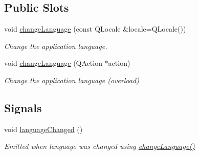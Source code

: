\subsection*{Public Slots}
\begin{DoxyCompactItemize}
\item 
void \hyperlink{classmdt_application_a60cf66d3ebe17d1e60a7dcc26410494d}{changeLanguage} (const QLocale \&locale=QLocale())
\begin{DoxyCompactList}\small\item\em Change the application language. \end{DoxyCompactList}\item 
void \hyperlink{classmdt_application_a7eec3fbe97863cb4a938fa58a5135b1b}{changeLanguage} (QAction $\ast$action)
\begin{DoxyCompactList}\small\item\em Change the application language (overload) \end{DoxyCompactList}\end{DoxyCompactItemize}
\subsection*{Signals}
\begin{DoxyCompactItemize}
\item 
\hypertarget{classmdt_application_a4200ade3b0b295ea8b0cb5239d967610}{
void \hyperlink{classmdt_application_a4200ade3b0b295ea8b0cb5239d967610}{languageChanged} ()}
\label{classmdt_application_a4200ade3b0b295ea8b0cb5239d967610}

\begin{DoxyCompactList}\small\item\em Emitted when language was changed using \hyperlink{classmdt_application_a60cf66d3ebe17d1e60a7dcc26410494d}{changeLanguage()} \end{DoxyCompactList}\end{DoxyCompactItemize}
